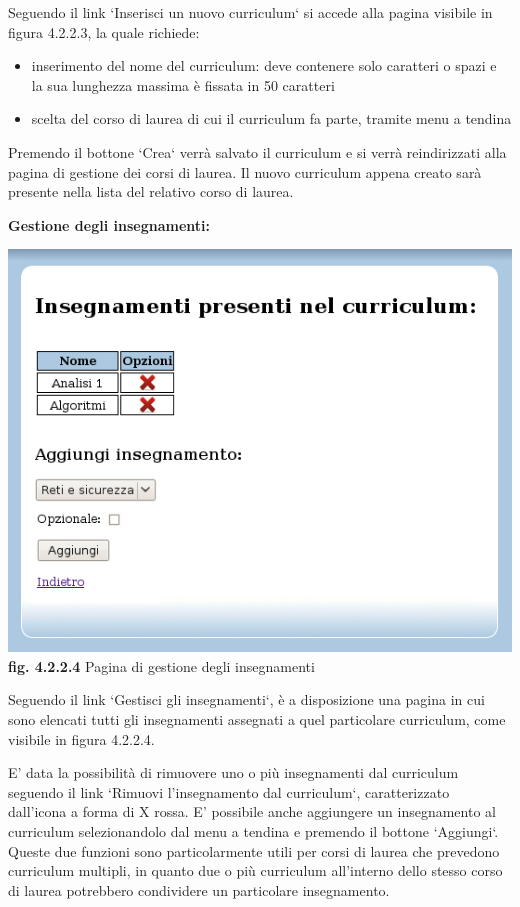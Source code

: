 \documentclass[11pt,a4paper]{article}
\begin{document}
Seguendo il link `Inserisci un nuovo curriculum` si accede alla pagina visibile in figura 4.2.2.3, la quale richiede:
\begin{itemize}
 \item inserimento del nome del curriculum: deve contenere solo caratteri o spazi e la sua lunghezza massima è fissata in 50 caratteri
 \item scelta del corso di laurea di cui il curriculum fa parte, tramite menu a tendina
\end{itemize}
Premendo il bottone `Crea` verrà salvato il curriculum e si verrà reindirizzati alla pagina di gestione dei corsi di laurea. Il nuovo curriculum appena creato sarà presente nella lista del relativo corso di laurea.
\newpage
\begin{large}\textbf{Gestione degli insegnamenti:}\end{large}

\bigskip
\begin{center}
	\includegraphics[scale=0.5]{images/gestisci_insegnamenti.jpg}\\
	\textbf{fig. 4.2.2.4} Pagina di gestione degli insegnamenti\\
\end{center}
\bigskip

Seguendo il link `Gestisci gli insegnamenti`, è a disposizione una pagina in cui sono elencati tutti gli insegnamenti assegnati a quel particolare curriculum, come visibile in figura 4.2.2.4.

E' data la possibilità di rimuovere uno o più insegnamenti dal curriculum seguendo il link `Rimuovi l'insegnamento dal curriculum`, caratterizzato dall'icona a forma di X rossa.
E' possibile anche aggiungere un insegnamento al curriculum selezionandolo dal menu a tendina e premendo il bottone `Aggiungi`.
Queste due funzioni sono particolarmente utili per corsi di laurea che prevedono curriculum multipli, in quanto due o più curriculum all'interno dello stesso corso di laurea potrebbero condividere un particolare insegnamento.
\end{document}
